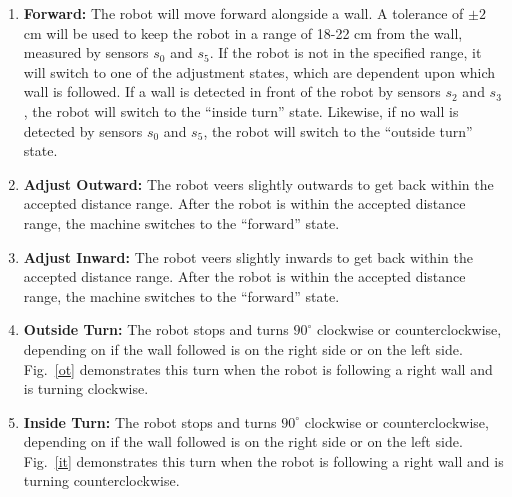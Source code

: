 \begin{enumerate}
\item \textbf{Forward:} The robot will move forward alongside a
  wall. A tolerance of \(\pm2\) cm will be used to keep the robot in a
  range of 18-22 cm from the wall, measured by sensors
  \(s_0\) and \(s_5\).  If the robot is not in the specified range, it
  will switch to one of the adjustment states, which are dependent upon
  which wall is followed.  If a wall is detected in front of the robot
  by sensors \(s_2\) and \(s_3\), the robot will switch to the ``inside
  turn'' state. Likewise, if no wall is detected by sensors \(s_0\) and
  \(s_5\), the robot will switch to the ``outside turn'' state.
\item \textbf{Adjust Outward:} The robot veers slightly outwards to get
  back within the accepted distance range. After the robot is within
  the accepted distance range, the machine switches to the ``forward''
  state.
\item \textbf{Adjust Inward:} The robot veers slightly inwards to get
  back within the accepted distance range. After the robot is within
  the accepted distance range, the machine switches to the ``forward''
  state.
\item \textbf{Outside Turn:} The robot stops and turns \(90^\circ\) clockwise
  or counterclockwise, depending on if the wall followed is on the
  right side or on the left side. Fig.~\ref{ot} demonstrates this turn when
  the robot is following a right wall and is turning clockwise.
\item \textbf{Inside Turn:} The robot stops and turns \(90^\circ\) clockwise or
  counterclockwise, depending on if the wall followed is on the right
  side or on the left side. Fig.~\ref{it} demonstrates this turn when the
  robot is following a right wall and is turning counterclockwise.
\end{enumerate}

